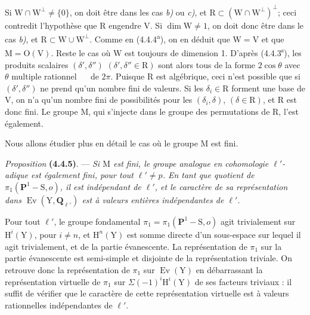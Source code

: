 \documentclass[11pt,leqno]{article}
\newcommand{\Page}[1]{\ifvmode\noindent\else\unskip\ \fi{\footnotesize\textcolor{gray}{[p.\,#1]}}\ \ignorespaces}
\begin{document}
Si \(\mathrm{W}\cap\mathrm{W}^{\perp}\neq\{0\}\), on doit être dans les cas \textit{b)} ou \textit{c)}, et \(\mathrm{R}\subset(\mathrm{W}\cap\mathrm{W}^{\perp})^{\perp}\); ceci contredit l’hypothèse que \(\mathrm{R}\) engendre \(\mathrm{V}\). Si \(\dim\mathrm{W}\neq1\), on doit donc être dans le cas \textit{b)}, et \(\mathrm{R}\subset\mathrm{W}\cup\mathrm{W}^{\perp}\). Comme en (4.4.4\textsuperscript{a}), on en déduit que \(\mathrm{W}=\mathrm{V}\) et que \(\mathrm{M}=\mathrm{O}(\mathrm{V})\). Reste le cas où \(\mathrm{W}\) est toujours de dimension 1. D’après (4.4.3\textsuperscript{s}), les produits scalaires \((\delta',\delta'')\) \((\delta',\delta''\in\mathrm{R})\) sont alors tous de la forme \(2\cos\theta\) avec \(\theta\) multiple rationnel
\Page{229}
de \(2\pi\). Puisque \(\mathrm{R}\) est algébrique, ceci n’est possible que si \((\delta',\delta'')\) ne prend qu’un nombre fini de valeurs. Si les \(\delta_i\in\mathrm{R}\) forment une base de \(\mathrm{V}\), on n’a qu’un nombre fini de possibilités pour les \((\delta_i,\delta)\), \((\delta\in\mathrm{R})\), et \(\mathrm{R}\) est donc fini. Le groupe \(\mathrm{M}\), qui s’injecte dans le groupe des permutations de \(\mathrm{R}\), l’est également.

Nous allons étudier plus en détail le cas où le groupe \(\mathrm{M}\) est fini.

\textit{Proposition} \textbf{(4.4.5)}. — \textit{Si \(\mathrm{M}\) est fini, le groupe analogue en cohomologie \(\ell'\)-adique est également fini, pour tout \(\ell'\neq p\). En tant que quotient de \(\pi_1(\mathbf{P}^1-\mathrm{S},o)\), il est indépendant de \(\ell'\), et le caractère de sa représentation dans \(\operatorname{Ev}(\mathrm{Y},\mathbf{Q}_{\ell'})\) est à valeurs entières indépendantes de \(\ell'\).}

Pour tout \(\ell'\), le groupe fondamental \(\pi_1=\pi_1(\mathbf{P}^1-\mathrm{S},o)\) agit trivialement sur \(\mathrm{H}^i(\mathrm{Y})\), pour \(i\neq n\), et \(\mathrm{H}^n(\mathrm{Y})\) est somme directe d’un sous-espace sur lequel il agit trivialement, et de la partie évanescente. La représentation de \(\pi_1\) sur la partie évanescente est semi-simple et disjointe de la représentation triviale. On retrouve donc la représentation de \(\pi_1\) sur \(\operatorname{Ev}(\mathrm{Y})\) en débarrassant la représentation virtuelle de \(\pi_1\) sur \(\Sigma(-1)^i\mathrm{H}^i(\mathrm{Y})\) de ses facteurs triviaux : il suffit de vérifier que le caractère de cette représentation virtuelle est à valeurs rationnelles indépendantes de \(\ell'\).
\end{document}
